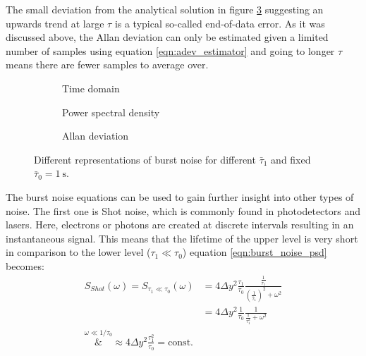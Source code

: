 The small deviation from the analytical solution in figure \ref{fig:burst_noise_adev} suggesting an upwards trend at large $\tau$ is a typical so-called end-of-data error. As it was discussed above, the Allan deviation can only be estimated given a limited number of samples using equation \ref{eqn:adev_estimator} and going to longer $\tau$ means there are fewer samples to average over.
\begin{figure}[ht]
    \centering
    \begin{subfigure}{0.8\linewidth}
        \centering
        \scalebox{1}{%
        } %
        \caption{Time domain}
        \label{fig:burst_noise_time}
    \end{subfigure}
    \begin{subfigure}{0.8\linewidth}
        \centering
        \scalebox{1}{%
        } %
        \caption{Power spectral density}
        \label{fig:burst_noise_psd}
    \end{subfigure}
    \begin{subfigure}{0.8\linewidth}
        \centering
        \scalebox{1}{%
        } %
        \caption{Allan deviation}
        \label{fig:burst_noise_adev}
    \end{subfigure}
    \caption{Different representations of burst noise for different $\bar \tau_1$ and fixed $\bar \tau_0 = \qty{1}{\s}$.}
    \label{fig:burst_noise_simulated}
\end{figure}

The burst noise equations can be used to gain further insight into other types of noise. The first one is Shot noise, which is commonly found in photodetectors and lasers. Here, electrons or photons are created at discrete intervals resulting in an instantaneous signal. This means that the lifetime of the upper level is very short in comparison to the lower level ($\tau_1 \ll \tau_0$) equation \ref{eqn:burst_noise_psd} becomes:
\begin{align}
    S_{Shot}(\omega) = S_{\tau_1 \ll \tau_0}(\omega) &= 4 \Delta y^2 \frac{\tau_1}{\tau_0} \frac{\frac{1}{\bar \tau_1}}{\left(\frac{1}{\bar \tau_1}\right)^2 + \omega^2}\nonumber\\
    &= 4 \Delta y^2 \frac{1}{\tau_0} \frac{1}{\frac{1}{\tau_1^2}+\omega^2}\\
    \overset{\omega \ll 1/\tau_0}&{\approx} 4 \Delta y^2 \frac{\tau_1^2}{\tau_0} = \text{const.}
\end{align}


